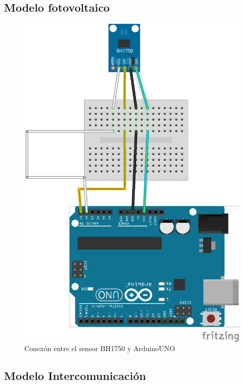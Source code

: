 \subsection{Modelo fotovoltaico}
\begin{center}
\begin{figure}[h]\label{fig:bh1750}
\includegraphics{images/bh1750_bb.png}
\caption{Conex\'on entre el sensor BH1750 y ArduinoUNO}

\end{figure}
\end{center}
\subsection{Modelo Intercomunicaci\'on}
